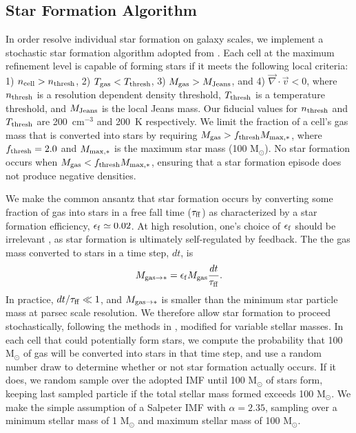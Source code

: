 \documentclass[twocolumn]{aastex61}
\begin{document}
\subsection{Star Formation Algorithm}
\label{sec:star formation}
In order resolve individual star formation on galaxy scales, we implement a stochastic star formation algorithm adopted from \citet{Goldbaum2015,Goldbaum2016}. Each cell at the maximum refinement level is capable of forming stars if it meets the following local criteria: 1) $n_{\rm cell} > n_{\rm thresh}$, 2) $T_{\rm gas} < T_{\rm thresh}$, 3) $M_{\rm gas} > M_{\rm Jeans}$, and 4) $\vec{\nabla} \cdot \vec{v} < 0$, where $n_{\rm thresh}$ is a resolution dependent density threshold, $T_{\rm thresh}$ is a temperature threshold, and $M_{\rm Jeans}$ is the local Jeans mass. Our fiducial values for $n_{\rm thresh}$ and $T_{\rm thresh}$ are 200~cm$^{-3}$ and 200~K respectively. We limit the fraction of a cell's gas mass that is converted into stars by requiring $M_{\rm gas} > f_{\rm thresh} M_{\rm max,*}$, where $f_{\rm thresh} = 2.0 $ and $M_{\rm max,*}$ is the maximum star mass (100 M$_{\odot}$). No star formation occurs when $M_{\rm gas} < f_{\rm thresh} M_{\rm max,*}$, ensuring that a star formation episode does not produce negative densities.

We make the common ansantz that star formation occurs by converting some fraction of gas into stars in a free fall time ($\tau_{\rm ff}$) as characterized by a star formation efficiency, $\epsilon_{\rm f} \simeq 0.02$. At high resolution, one's choice of $\epsilon_{\rm f}$ should be irrelevant \citep{Orr2017, FIRE2}, as star formation is ultimately self-regulated by feedback.
The the gas mass converted to stars in a time step, $dt$, is
\begin{equation}
M_{ {\rm gas} \to *} = \epsilon_{\rm f} M_{\rm gas} \frac{dt}{\tau_{\rm ff}}.
\end{equation}
In practice, $dt/\tau_{\rm ff} \ll 1$, and $M_{ {\rm gas} \to *}$ is smaller than the minimum star particle mass at parsec scale resolution. We therefore allow star formation to proceed stochastically, following the methods in \citet{Goldbaum2015, Goldbaum2016}, modified for variable stellar masses. In each cell that could potentially form stars, we compute the probability that 100 M$_{\odot}$ of gas will be converted into stars in that time step, and use a random number draw to determine whether or not star formation actually occurs. If it does, we random sample over the adopted IMF until 100 M$_{\odot}$ of stars form, keeping last sampled particle if the total stellar mass formed exceeds 100 M$_{\odot}$. We make the simple assumption of a Salpeter IMF \citep{Salpeter1955} with $\alpha = 2.35$, sampling over a minimum stellar mass of 1 M$_{\odot}$ and maximum stellar mass of 100 M$_{\odot}$. 
\end{document}
